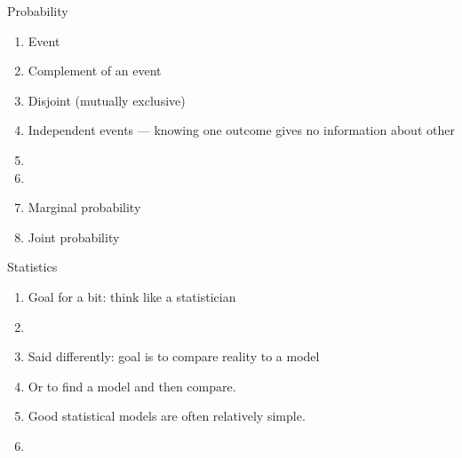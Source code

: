 Probability
\begin{enumerate}
\item Event
\item Complement of an event
\item Disjoint (mutually exclusive)
\item Independent events --- knowing one outcome gives no information about other
\item {}
\item {}
\item Marginal probability
\item Joint probability
\end{enumerate}

Statistics
\begin{enumerate}
\item Goal for a bit: think like a statistician
\item {}
\item Said differently: goal is to compare reality to a model
\item Or to find a model and then compare.
\item Good statistical models are often relatively simple.
\item {}
\end{enumerate}

